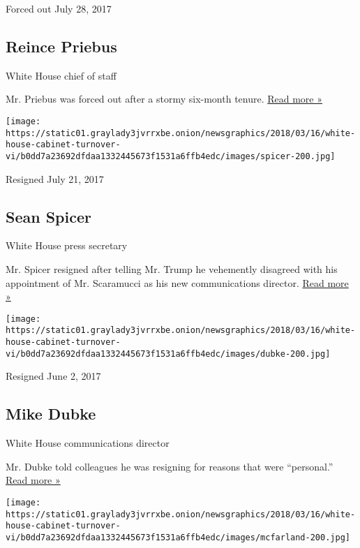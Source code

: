Forced out July 28, 2017

\hypertarget{reince-priebus}{%
\subsection{Reince Priebus}\label{reince-priebus}}

White House chief of staff

Mr. Priebus was forced out after a stormy six-month tenure.
\href{https://www.nytimes3xbfgragh.onion/2017/07/28/us/politics/reince-priebus-white-house-trump.html}{Read
more »}

\texttt{[image: https://static01.graylady3jvrrxbe.onion/newsgraphics/2018/03/16/white-house-cabinet-turnover-vi/b0dd7a23692dfdaa1332445673f1531a6ffb4edc/images/spicer-200.jpg]}

Resigned July 21, 2017

\hypertarget{sean-spicer}{%
\subsection{Sean Spicer}\label{sean-spicer}}

White House press secretary

Mr. Spicer resigned after telling Mr. Trump he vehemently disagreed with
his appointment of Mr. Scaramucci as his new communications director.
\href{https://www.nytimes3xbfgragh.onion/2017/07/21/us/politics/sean-spicer-resigns-as-white-house-press-secretary.html}{Read
more »}

\texttt{[image: https://static01.graylady3jvrrxbe.onion/newsgraphics/2018/03/16/white-house-cabinet-turnover-vi/b0dd7a23692dfdaa1332445673f1531a6ffb4edc/images/dubke-200.jpg]}

Resigned June 2, 2017

\hypertarget{mike-dubke}{%
\subsection{Mike Dubke}\label{mike-dubke}}

White House communications director

Mr. Dubke told colleagues he was resigning for reasons that were
``personal.''
\href{https://www.nytimes3xbfgragh.onion/2017/05/30/us/politics/trump-dubke-white-house-staff-changes.html}{Read
more »}

\texttt{[image: https://static01.graylady3jvrrxbe.onion/newsgraphics/2018/03/16/white-house-cabinet-turnover-vi/b0dd7a23692dfdaa1332445673f1531a6ffb4edc/images/mcfarland-200.jpg]}

